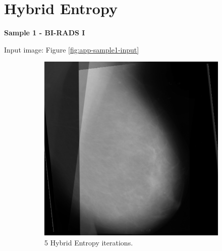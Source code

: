 \newpage
\section{Hybrid Entropy}

\newpage \noindent \textbf{Sample 1 - BI-RADS I}

Input image: Figure \ref{fig:app-sample1-input}

\begin{figure}[H]
    \centering
    \begin{subfigure}[t]{0.3\textwidth}
        \includegraphics[width=\textwidth]{Appendix5/sample1/hybrid/hybrid-5.png}
        \caption{5 Hybrid Entropy iterations.}
        \label{fig:app-5-hybrid-sample1}
    \end{subfigure} \hfill
    ~ %
    \begin{subfigure}[t]{0.3\textwidth}

\end{subfigure}
\end{figure}

